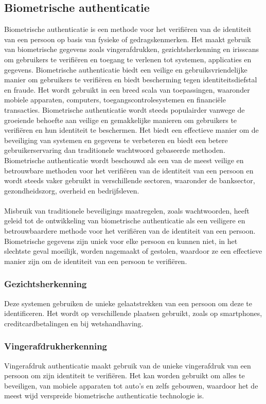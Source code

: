   \subsection{Biometrische authenticatie}%
  \label{subsec:biometrische-authenticatie}
  Biometrische authenticatie is een methode voor het verifiëren van de identiteit van een persoon op basis van fysieke of gedragskenmerken. Het maakt gebruik van biometrische gegevens zoals vingerafdrukken, gezichtsherkenning en irisscans om gebruikers te verifiëren en toegang te verlenen tot systemen, applicaties en gegevens. Biometrische authenticatie biedt een veilige en gebruiksvriendelijke manier om gebruikers te verifiëren en biedt bescherming tegen identiteitsdiefstal en fraude. Het wordt gebruikt in een breed scala van toepassingen, waaronder mobiele apparaten, computers, toegangscontrolesystemen en financiële transacties. Biometrische authenticatie wordt steeds populairder vanwege de groeiende behoefte aan veilige en gemakkelijke manieren om gebruikers te verifiëren en hun identiteit te beschermen. Het biedt een effectieve manier om de beveiliging van systemen en gegevens te verbeteren en biedt een betere gebruikerservaring dan traditionele wachtwoord gebaseerde methoden. Biometrische authenticatie wordt beschouwd als een van de meest veilige en betrouwbare methoden voor het verifiëren van de identiteit van een persoon en wordt steeds vaker gebruikt in verschillende sectoren, waaronder de banksector, gezondheidszorg, overheid en bedrijfsleven.
  \\
  \\
  Misbruik van traditionele beveiligings maatregelen, zoals wachtwoorden, heeft geleid tot de ontwikkeling van biometrische authenticatie als een veiligere en betrouwbaardere methode voor het verifiëren van de identiteit van een persoon. Biometrische gegevens zijn uniek voor elke persoon en kunnen niet, in het slechtste geval moeilijk, worden nagemaakt of gestolen, waardoor ze een effectieve manier zijn om de identiteit van een persoon te verifiëren.
  
  \subsubsection{Gezichtsherkenning}%
  \label{subsubsec:gezichtsherkenning}
  Deze systemen gebruiken de unieke gelaatstrekken van een persoon om deze te identificeren. Het wordt op verschillende plaatsen gebruikt, zoals op smartphones, creditcardbetalingen en bij wetshandhaving.
  
  \subsubsection{Vingerafdrukherkenning}%
  \label{subsubsec:vingerafdrukherkenning}
  Vingerafdruk authenticatie maakt gebruik van de unieke vingerafdruk van een persoon om zijn identiteit te verifiëren. Het kan worden gebruikt om alles te beveiligen, van mobiele apparaten tot auto's en zelfs gebouwen, waardoor het de meest wijd verspreide biometrische authenticatie technologie is.
  
